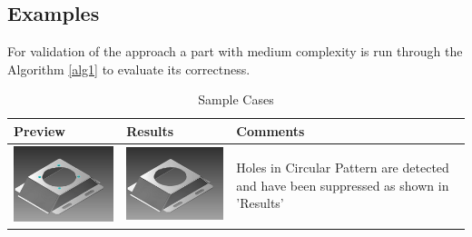 
\subsection{Examples}

For validation of the approach a part with medium complexity is run through the Algorithm \ref{alg1} to evaluate its correctness.

\begin{longtable}{ C{0.28\textwidth}  C{0.28\textwidth}  L{0.4\textwidth}}
\caption{Sample Cases}\\
\hline
{\bf Preview} & {\bf Results} & {\bf Comments} \\
\hline

\includegraphics[scale=.72]{..//Common/images//defeatmodel1.png} &
\includegraphics[scale=.72]{..//Common/images//defeatresult1.png} &
Holes in Circular Pattern are detected and have been suppressed as shown in 'Results'\\



\end{longtable}
